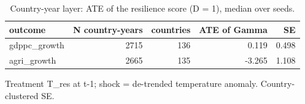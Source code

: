 \begin{table}[htbp]
\centering
\caption{Country-year layer: ATE of the resilience score (D = 1), median over seeds.}
\label{tab:layer1}
\begin{tabular}{lrrrr}
\toprule
outcome & N country-years & countries & ATE of Gamma & SE \\
\midrule
gdppc\_growth & 2715 & 136 & 0.119 & 0.498 \\
agri\_growth & 2665 & 135 & -3.265 & 1.108 \\
\bottomrule
\end{tabular}
\par\smallskip\footnotesize Treatment T\_res at t-1; shock = de-trended temperature anomaly. Country-clustered SE.
\end{table}
